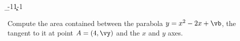 
\SQUARE\va\vs
\DIVIDE{}\vb
\SQUARE\vx\vw
\EXPR[0]\vy{\vw - \va*\vx + \vb}

\EXPR[0]
\FRACDIV{}\vj\vk
\LINEINTERCEPT\vx\vy{}\a\b
\FRACMULT\a\b{-1}{1}\c\d

\FRACDIV\a\b{-\vm}{1}\ve\vf
\DIVIDE{}\vg

\question[4] Compute the area contained between the parabola $y=x^2-\va x+\vb$, the
tangent to it at point $A=(\vx,\vy)$ and the $x$ and $y$ axes.

\watchout

